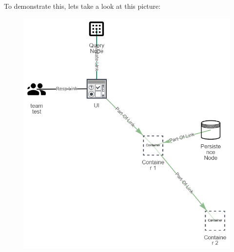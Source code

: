 \begin{itemize}
To demonstrate this, lets take a look at this picture:
\begin{figure}[H]
\centering
\includegraphics[scale=.55]{Bilder/CollapseExBefore.png}
\end{figure}


\end{itemize}
